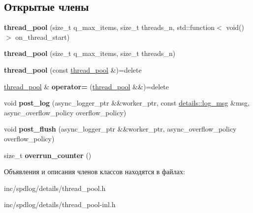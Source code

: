 \subsection*{Открытые члены}
\begin{DoxyCompactItemize}
\item 
\mbox{\label{classspdlog_1_1details_1_1thread__pool_a4f45ddae2c3d077bb9ea3441895a5b9d}} 
{\bfseries thread\+\_\+pool} (size\+\_\+t q\+\_\+max\+\_\+items, size\+\_\+t threads\+\_\+n, std\+::function$<$ void()$>$ on\+\_\+thread\+\_\+start)
\item 
\mbox{\label{classspdlog_1_1details_1_1thread__pool_a1f49d7e178718170271c72da9e165053}} 
{\bfseries thread\+\_\+pool} (size\+\_\+t q\+\_\+max\+\_\+items, size\+\_\+t threads\+\_\+n)
\item 
\mbox{\label{classspdlog_1_1details_1_1thread__pool_a5e8f86d40f81af1d22a21ee0368287b2}} 
{\bfseries thread\+\_\+pool} (const \hyperlink{classspdlog_1_1details_1_1thread__pool}{thread\+\_\+pool} \&)=delete
\item 
\mbox{\label{classspdlog_1_1details_1_1thread__pool_a1a62f3ab1474d69cd1e25143664e856d}} 
\hyperlink{classspdlog_1_1details_1_1thread__pool}{thread\+\_\+pool} \& {\bfseries operator=} (\hyperlink{classspdlog_1_1details_1_1thread__pool}{thread\+\_\+pool} \&\&)=delete
\item 
\mbox{\label{classspdlog_1_1details_1_1thread__pool_a4b05c446cb5f534a48252c01a3dd0a68}} 
void {\bfseries post\+\_\+log} (async\+\_\+logger\+\_\+ptr \&\&worker\+\_\+ptr, const \hyperlink{structspdlog_1_1details_1_1log__msg}{details\+::log\+\_\+msg} \&msg, async\+\_\+overflow\+\_\+policy overflow\+\_\+policy)
\item 
\mbox{\label{classspdlog_1_1details_1_1thread__pool_a956aff0a28fa1e2dcd895cbfaf7d2044}} 
void {\bfseries post\+\_\+flush} (async\+\_\+logger\+\_\+ptr \&\&worker\+\_\+ptr, async\+\_\+overflow\+\_\+policy overflow\+\_\+policy)
\item 
\mbox{\label{classspdlog_1_1details_1_1thread__pool_a2b5a7b2160603f01d0d65ce23aa9a733}} 
size\+\_\+t {\bfseries overrun\+\_\+counter} ()
\end{DoxyCompactItemize}


Объявления и описания членов классов находятся в файлах\+:\begin{DoxyCompactItemize}
\item 
inc/spdlog/details/thread\+\_\+pool.\+h\item 
inc/spdlog/details/thread\+\_\+pool-\/inl.\+h\end{DoxyCompactItemize}
